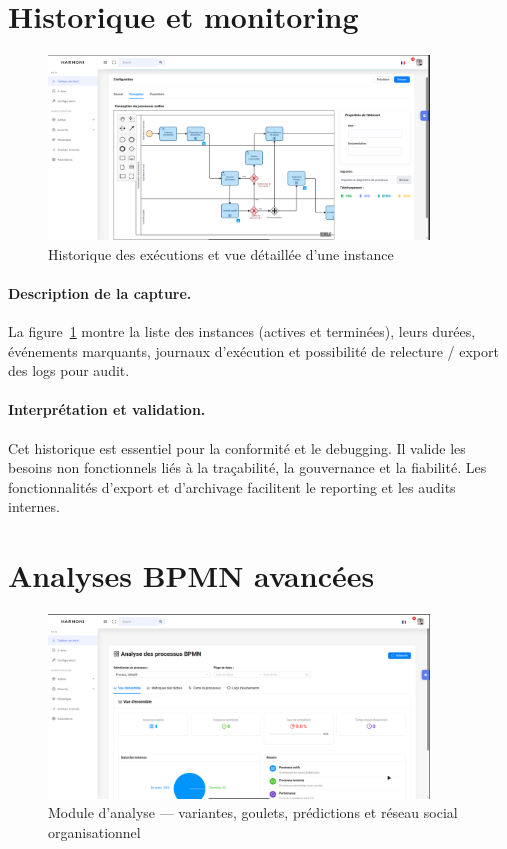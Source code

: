 \section{Historique et monitoring}

\begin{figure}[H]
    \centering
    \includegraphics[width=0.9\textwidth]{Images/configuration.png}
    \caption{Historique des exécutions et vue détaillée d’une instance}
    \label{fig:historique}
\end{figure}

\paragraph{Description de la capture.}  
La figure~\ref{fig:historique} montre la liste des instances (actives et terminées), leurs durées, événements marquants, journaux d’exécution et possibilité de relecture / export des logs pour audit.

\paragraph{Interprétation et validation.}  
Cet historique est essentiel pour la conformité et le debugging. Il valide les besoins non fonctionnels liés à la traçabilité, la gouvernance et la fiabilité. Les fonctionnalités d’export et d’archivage facilitent le reporting et les audits internes.

\section{Analyses BPMN avancées}

\begin{figure}[H]
    \centering
    \includegraphics[width=0.9\textwidth]{Images/analyse.png}
    \caption{Module d’analyse — variantes, goulets, prédictions et réseau social organisationnel}
    \label{fig:analyse}
\end{figure}

